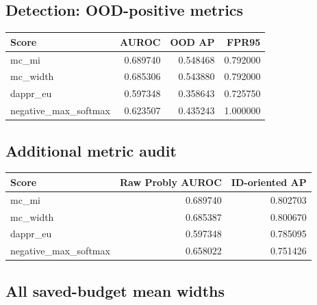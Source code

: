 \reservetable
\subsection{Detection: OOD-positive metrics}

\begingroup\small
\setlength{\tabcolsep}{4pt}
\begin{longtable}{lrrr}
\toprule

Score & AUROC & OOD AP & FPR95\\\midrule\endhead

mc\_mi & 0.689740 & 0.548468 & 0.792000\\

mc\_width & 0.685306 & 0.543880 & 0.792000\\

dappr\_eu & 0.597348 & 0.358643 & 0.725750\\

negative\_max\_softmax & 0.623507 & 0.435243 & 1.000000\\

\bottomrule
\end{longtable}
\endgroup

\reservetable
\subsection{Additional metric audit}

\begingroup\small
\setlength{\tabcolsep}{4pt}
\begin{longtable}{lrr}
\toprule

Score & Raw Probly AUROC & ID-oriented AP\\\midrule\endhead

mc\_mi & 0.689740 & 0.802703\\

mc\_width & 0.685387 & 0.800670\\

dappr\_eu & 0.597348 & 0.785095\\

negative\_max\_softmax & 0.658022 & 0.751426\\

\bottomrule
\end{longtable}
\endgroup

\reservetable
\subsection{All saved-budget mean widths}

